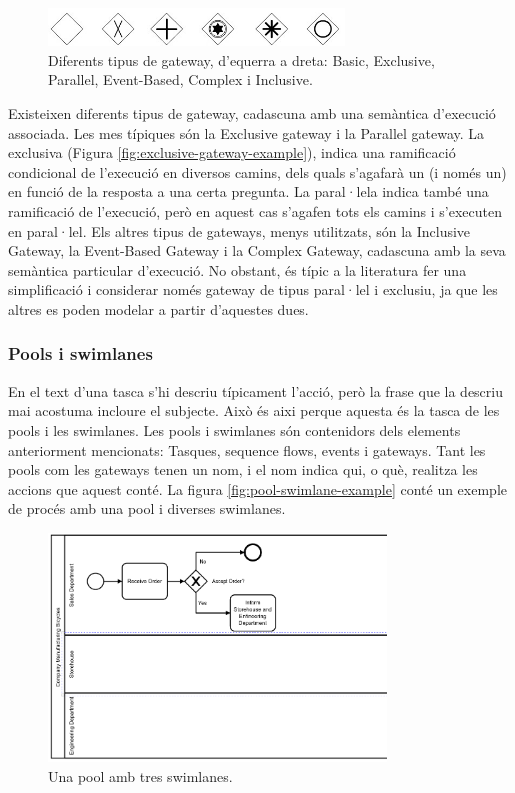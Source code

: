 \begin{figure}[!hbt]
    \centering
    \includegraphics[width=0.7\textwidth]{figures/bpmn-gateways.jpg}
    \caption{Diferents tipus de gateway, d'equerra a dreta: Basic, Exclusive, Parallel, Event-Based, Complex i Inclusive.}
    \label{fig:gateway-example}
\end{figure}

Existeixen diferents tipus de gateway, cadascuna amb una semàntica d'execució associada. Les mes típiques són la Exclusive gateway i la Parallel gateway. La exclusiva (Figura \ref{fig:exclusive-gateway-example}), indica una ramificació condicional de l'execució en diversos camins, dels quals s'agafarà un (i només un) en funció de la resposta a una certa pregunta. La paral·lela indica també una ramificació de l'execució, però en aquest cas s'agafen tots els camins i s'executen en paral·lel. Els altres tipus de gateways, menys utilitzats, són la Inclusive Gateway, la Event-Based Gateway i la Complex Gateway, cadascuna amb la seva semàntica particular d'execució. No obstant, és típic a la literatura fer una simplificació i considerar només gateway de tipus paral·lel i exclusiu, ja que les altres es poden modelar a partir d'aquestes dues.

\subsubsection{Pools i swimlanes}

En el text d'una tasca s'hi descriu típicament l'acció, però la frase que la descriu mai acostuma incloure el subjecte. Això és aixi perque aquesta és la tasca de les pools i les swimlanes. Les pools i swimlanes són contenidors dels elements anteriorment mencionats: Tasques, sequence flows, events i gateways. Tant les pools com les gateways tenen un nom, i el nom indica qui, o què, realitza les accions que aquest conté. La figura \ref{fig:pool-swimlane-example} conté un exemple de procés amb una pool i diverses swimlanes.

\begin{figure}[!hbt]
    \centering
    \includegraphics[width=0.8\textwidth]{figures/bpmn-pools.png}
    \caption{Una pool amb tres swimlanes.}
    \label{fig:swimlane-example}
\end{figure}

